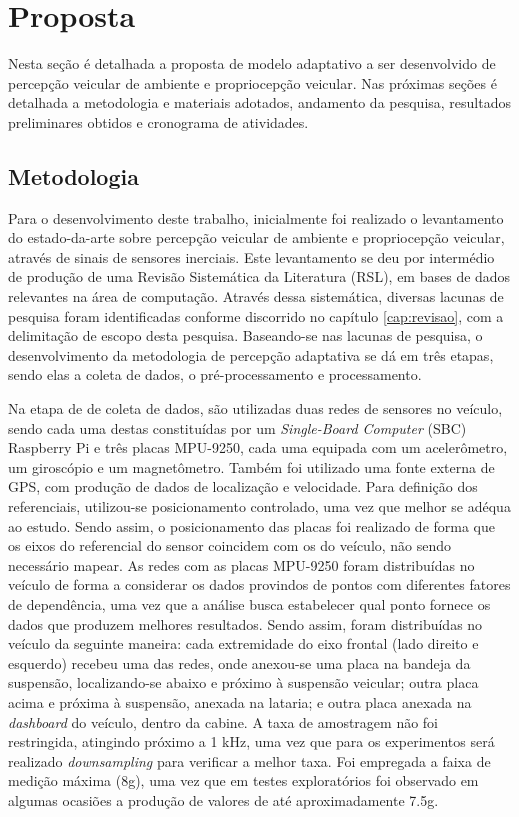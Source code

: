 \chapter{Proposta}
\label{cap:proposta}

Nesta seção é detalhada a proposta de modelo adaptativo a ser desenvolvido de percepção veicular de ambiente e propriocepção veicular. Nas próximas seções é detalhada a metodologia e materiais adotados, andamento da pesquisa, resultados preliminares obtidos e cronograma de atividades.

\section{Metodologia}

Para o desenvolvimento deste trabalho, inicialmente foi realizado o levantamento do estado-da-arte sobre percepção veicular de ambiente e propriocepção veicular, através de sinais de sensores inerciais. Este levantamento se deu por intermédio de produção de uma Revisão Sistemática da Literatura (RSL), em bases de dados relevantes na área de computação. Através dessa sistemática, diversas lacunas de pesquisa foram identificadas conforme discorrido no capítulo \ref{cap:revisao}, com a delimitação de escopo desta pesquisa. Baseando-se nas lacunas de pesquisa, o desenvolvimento da metodologia de percepção adaptativa se dá em três etapas, sendo elas a coleta de dados, o pré-processamento e processamento. 

Na etapa de de coleta de dados, são utilizadas duas redes de sensores no veículo, sendo cada uma destas constituídas por um \textit{Single-Board Computer} (SBC) Raspberry Pi e três placas MPU-9250, cada uma equipada com um acelerômetro, um giroscópio e um magnetômetro. Também foi utilizado uma fonte externa de GPS, com produção de dados de localização e velocidade. Para definição dos referenciais, utilizou-se posicionamento controlado, uma vez que melhor se adéqua ao estudo. Sendo assim, o posicionamento das placas foi realizado de forma que os eixos do referencial do sensor coincidem com os do veículo, não sendo necessário mapear. As redes com as placas MPU-9250 foram distribuídas no veículo de forma a considerar os dados provindos de pontos com diferentes fatores de dependência, uma vez que a análise busca estabelecer qual ponto fornece os dados que produzem melhores resultados. Sendo assim, foram distribuídas no veículo da seguinte maneira: cada extremidade do eixo frontal (lado direito e esquerdo) recebeu uma das redes, onde anexou-se uma placa na bandeja da suspensão, localizando-se abaixo e próximo à suspensão veicular; outra placa acima e próxima à suspensão, anexada na lataria; e outra placa anexada na \textit{dashboard} do veículo, dentro da cabine. A taxa de amostragem não foi restringida, atingindo próximo a 1 kHz, uma vez que para os experimentos será realizado \textit{downsampling} para verificar a melhor taxa. Foi empregada a faixa de medição máxima (8g), uma vez que em testes exploratórios foi observado em algumas ocasiões a produção de valores de até aproximadamente 7.5g. 

